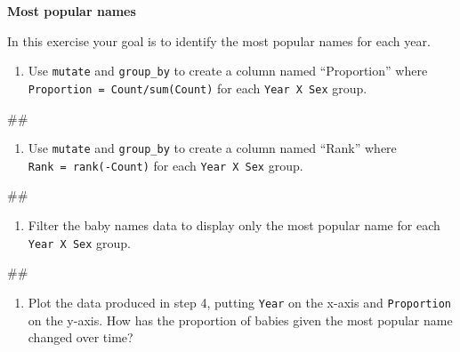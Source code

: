 \documentclass[]{book}
\newenvironment{Shaded}{\begin{snugshade}}{\end{snugshade}}
\newcommand{\NormalTok}[1]{#1}
\providecommand{\tightlist}{%
  \setlength{\itemsep}{0pt}\setlength{\parskip}{0pt}}
\begin{document}
\textbf{Most popular names}

In this exercise your goal is to identify the most popular names for
each year.

\begin{enumerate}
\def\labelenumi{\arabic{enumi}.}
\tightlist
\item
  Use \texttt{mutate} and \texttt{group\_by} to create a column named
  ``Proportion'' where \texttt{Proportion\ =\ Count/sum(Count)} for each
  \texttt{Year\ X\ Sex} group.
\end{enumerate}

\begin{Shaded}
\begin{Highlighting}[]
\NormalTok{##}
\end{Highlighting}
\end{Shaded}

\begin{enumerate}
\def\labelenumi{\arabic{enumi}.}
\setcounter{enumi}{1}
\tightlist
\item
  Use \texttt{mutate} and \texttt{group\_by} to create a column named
  ``Rank'' where \texttt{Rank\ =\ rank(-Count)} for each
  \texttt{Year\ X\ Sex} group.
\end{enumerate}

\begin{Shaded}
\begin{Highlighting}[]
\NormalTok{##}
\end{Highlighting}
\end{Shaded}

\begin{enumerate}
\def\labelenumi{\arabic{enumi}.}
\setcounter{enumi}{2}
\tightlist
\item
  Filter the baby names data to display only the most popular name for
  each \texttt{Year\ X\ Sex} group.
\end{enumerate}

\begin{Shaded}
\begin{Highlighting}[]
\NormalTok{##}
\end{Highlighting}
\end{Shaded}

\begin{enumerate}
\def\labelenumi{\arabic{enumi}.}
\setcounter{enumi}{3}
\tightlist
\item
  Plot the data produced in step 4, putting \texttt{Year} on the x-axis
  and \texttt{Proportion} on the y-axis. How has the proportion of
  babies given the most popular name changed over time?
\end{enumerate}
\end{document}
